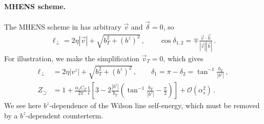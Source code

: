 \documentclass[11pt,a4paper]{article}
\newcommand{\eps}{\epsilon}
\newcommand{\cO}{\mathcal{O}}
\newcommand{\nn}{\nonumber}
\newcommand{\as}{\alpha_s}
\newcommand{\staple}{\sqsupset}
\begin{document}
\paragraph{MHENS scheme.}
The MHENS scheme in  has arbitrary $\vec v$
and $\vec\delta = 0$, so
\begin{align}
 \ell_\perp = 2 \eta |\vec v| + \sqrt{b_T^2 + (b^z)^2}
\,,\qquad
 \cos\delta_{1,2} = \mp \frac{\vec v \cdot \vec b}{|\vec v| |\vec b|}
\,.\end{align}
For illustration, we make the simplification $\vec v_T = 0$, which gives
\begin{align}
 \ell_\perp &= 2 \eta |v^z| + \sqrt{b_T^2 + (b^z)^2}
\,,\qquad
 \delta_1 = \pi - \delta_2 = \tan^{-1}\frac{b_T}{|b^z|}
 \,,\nn\\
 Z_\staple &= 1 + \frac{\as C_F}{2\pi} \frac{1}{\eps}
            \left[ 3 -2  \frac{|b^z|}{b_T} \left( \tan^{-1}\frac{b_T}{|b^z|} - \frac{\pi}{2} \right)  \right]
             + \cO(\as^2)
\,.\end{align}
We see here $b^z$-dependence of the Wilson line self-energy, which must be removed by a $b^z$-dependent counterterm.




\end{document}

